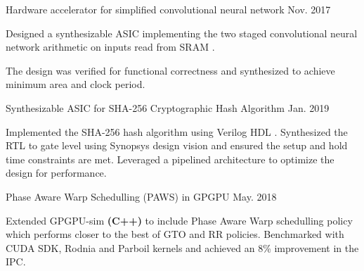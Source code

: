 \begin{cvprojects}
    \par\addvspace{0ex}
    \begin{flushleft}
    \par\addvspace{-1.5mm}
    \fontsize{10.4pt}{1em}\selectfont{}
    \end{flushleft}
    \par\addvspace{0.3ex}
    \cvproject
    {Hardware accelerator for simplified convolutional neural network }
    {\color{darkgray}Nov. 2017}
    {
      \begin{cvprojectitems}
        \item {Designed a synthesizable ASIC implementing the two staged convolutional neural network arithmetic on inputs read from SRAM . }
        \item {The design was verified for functional correctness and synthesized to achieve minimum area and clock period.} 
      \end{cvprojectitems}
    }

    \cvproject
    {Synthesizable ASIC for SHA-256 Cryptographic Hash Algorithm }
    {\color{darkgray}Jan. 2019}
    {
      \begin{cvprojectitems}
        \item {Implemented the SHA-256 hash algorithm using Verilog HDL . Synthesized the RTL to gate level using Synopsys design vision and ensured the setup and hold time constraints are met. Leveraged a pipelined architecture to optimize the design for performance. }
      \end{cvprojectitems}
    }

    \par\addvspace{1ex}
    \begin{flushleft}
    \par\addvspace{-1.5mm}
    \fontsize{10.4pt}{1em}\selectfont{}
    \end{flushleft}
    \par\addvspace{0.3ex}
    \cvproject
    {Phase Aware Warp Schedulling (PAWS) in GPGPU }
    {\color{darkgray}May. 2018}
    {
      \begin{cvprojectitems}
        \item {Extended GPGPU-sim \textbf{(C++)} to include Phase Aware Warp schedulling policy which performs closer to the best of GTO and RR policies. Benchmarked with CUDA SDK, Rodnia and Parboil kernels and achieved an 8\% improvement in the IPC.} 
      \end{cvprojectitems}
    }


\end{cvprojects}
